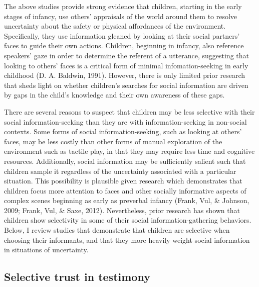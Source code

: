 \documentclass[floatsintext,man]{apa6}
\theoremstyle{definition}
\theoremstyle{definition}
\theoremstyle{definition}
\theoremstyle{remark}
\begin{document}
The above studies provide strong evidence that children, starting in the
early stages of infancy, use others' appraisals of the world around them
to resolve uncertainty about the safety or physical affordances of the
environment. Specifically, they use information gleaned by looking at
their social partners' faces to guide their own actions. Children,
beginning in infancy, also reference speakers' gaze in order to
determine the referent of a utterance, suggesting that looking to
others' faces is a critical form of minimal infomation-seeking in early
childhood (D. A. Baldwin, 1991). However, there is only limited prior
research that sheds light on whether children's searches for social
information are driven by gaps in the child's knowledge and their own
awareness of these gaps.

There are several reasons to suspect that children may be less selective
with their social information-seeking than they are with
information-seeking in non-social contexts. Some forms of social
information-seeking, such as looking at others' faces, may be less
costly than other forms of manual exploration of the environment such as
tactile play, in that they may require less time and cognitive
resources. Additionally, social information may be sufficiently salient
such that children sample it regardless of the uncertainty associated
with a particular situation. This possibility is plausible given
research which demonstrates that children focus more attention to faces
and other socially informative aspects of complex scenes beginning as
early as preverbal infancy (Frank, Vul, \& Johnson, 2009; Frank, Vul, \&
Saxe, 2012). Nevertheless, prior research has shown that children show
selectivity in some of their social information-gathering behaviors.
Below, I review studies that demonstrate that children are selective
when choosing their informants, and that they more heavily weight social
information in situations of uncertainty.

\subsection{Selective trust in
testimony}\label{selective-trust-in-testimony}
\end{document}
